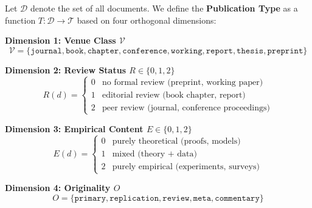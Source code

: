 \begin{tcolorbox}[colback=blue!5!white, colframe=blue!75!black,
    title=\textbf{Definition 0: Publication Type Space $\mathcal{T}$}]

Let $\mathcal{D}$ denote the set of all documents. We define the \textbf{Publication Type}
as a function $T: \mathcal{D} \to \mathcal{T}$ based on four orthogonal dimensions:

\textbf{Dimension 1: Venue Class $\mathcal{V}$}
\begin{equation}
\mathcal{V} = \{\texttt{journal}, \texttt{book}, \texttt{chapter}, \texttt{conference}, \texttt{working}, \texttt{report}, \texttt{thesis}, \texttt{preprint}\}
\end{equation}

\textbf{Dimension 2: Review Status $R \in \{0, 1, 2\}$}
\begin{equation}
R(d) = \begin{cases}
0 & \text{no formal review (preprint, working paper)} \\
1 & \text{editorial review (book chapter, report)} \\
2 & \text{peer review (journal, conference proceedings)}
\end{cases}
\end{equation}

\textbf{Dimension 3: Empirical Content $E \in \{0, 1, 2\}$}
\begin{equation}
E(d) = \begin{cases}
0 & \text{purely theoretical (proofs, models)} \\
1 & \text{mixed (theory + data)} \\
2 & \text{purely empirical (experiments, surveys)}
\end{cases}
\end{equation}

\textbf{Dimension 4: Originality $O$}
\begin{equation}
O = \{\texttt{primary}, \texttt{replication}, \texttt{review}, \texttt{meta}, \texttt{commentary}\}
\end{equation}

\end{tcolorbox}


